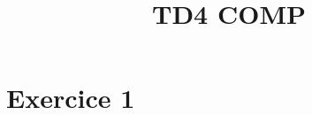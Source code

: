 \documentclass[a4paper, 11pt]{article}
\title{TD4 COMP}
\author{}
\begin{document}
\maketitle

\section{Exercice 1}
\end{document}
